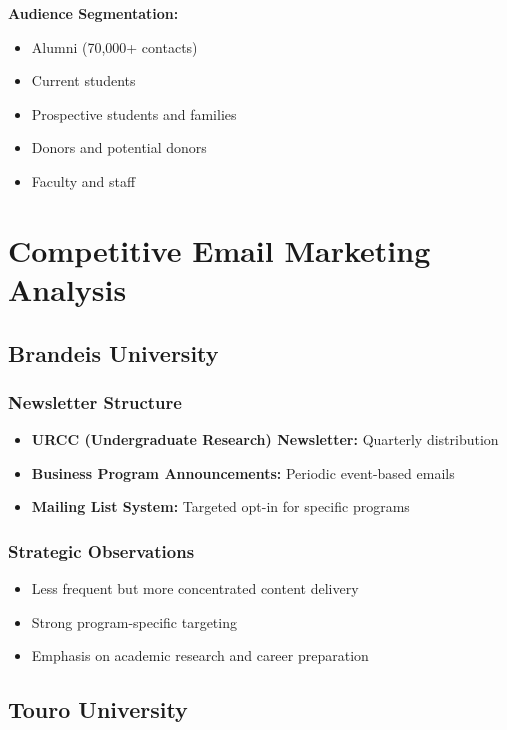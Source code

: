 \documentclass[12pt,letterpaper]{article}
\begin{document}
\textbf{Audience Segmentation:}
\begin{itemize}[leftmargin=*]
    \item Alumni (70,000+ contacts)
    \item Current students
    \item Prospective students and families
    \item Donors and potential donors
    \item Faculty and staff
\end{itemize}

\section{Competitive Email Marketing Analysis}

\subsection{Brandeis University}

\subsubsection{Newsletter Structure}
\begin{itemize}[leftmargin=*]
    \item \textbf{URCC (Undergraduate Research) Newsletter:} Quarterly distribution
    \item \textbf{Business Program Announcements:} Periodic event-based emails
    \item \textbf{Mailing List System:} Targeted opt-in for specific programs
\end{itemize}

\subsubsection{Strategic Observations}
\begin{itemize}[leftmargin=*]
    \item Less frequent but more concentrated content delivery
    \item Strong program-specific targeting
    \item Emphasis on academic research and career preparation
\end{itemize}

\subsection{Touro University}
\end{document}
